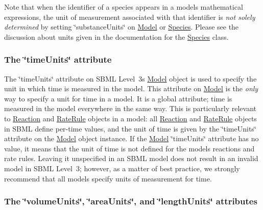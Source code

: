 Note that when the identifier of a species appears in a model\textquotesingle{}s mathematical expressions, the unit of measurement associated with that identifier is {\itshape not solely determined} by setting \char`\"{}substance\+Units\char`\"{} on \hyperlink{class_model}{Model} or \hyperlink{class_species}{Species}. Please see the discussion about units given in the documentation for the \hyperlink{class_species}{Species} class.\hypertarget{class_model_model-l3-timeunits}{}\subsubsection{The \char`\"{}time\+Units\char`\"{} attribute}\label{class_model_model-l3-timeunits}
The \char`\"{}time\+Units\char`\"{} attribute on S\+B\+ML Level~3\textquotesingle{}s \hyperlink{class_model}{Model} object is used to specify the unit in which time is measured in the model. This attribute on \hyperlink{class_model}{Model} is the {\itshape only} way to specify a unit for time in a model. It is a global attribute; time is measured in the model everywhere in the same way. This is particularly relevant to \hyperlink{class_reaction}{Reaction} and \hyperlink{class_rate_rule}{Rate\+Rule} objects in a model\+: all \hyperlink{class_reaction}{Reaction} and \hyperlink{class_rate_rule}{Rate\+Rule} objects in S\+B\+ML define per-\/time values, and the unit of time is given by the \char`\"{}time\+Units\char`\"{} attribute on the \hyperlink{class_model}{Model} object instance. If the \hyperlink{class_model}{Model} \char`\"{}time\+Units\char`\"{} attribute has no value, it means that the unit of time is not defined for the model\textquotesingle{}s reactions and rate rules. Leaving it unspecified in an S\+B\+ML model does not result in an invalid model in S\+B\+ML Level~3; however, as a matter of best practice, we strongly recommend that all models specify units of measurement for time.\hypertarget{class_model_model-l3-voletc}{}\subsubsection{The \char`\"{}volume\+Units\char`\"{}, \char`\"{}area\+Units\char`\"{}, and \char`\"{}length\+Units\char`\"{} attributes}\label{class_model_model-l3-voletc}
